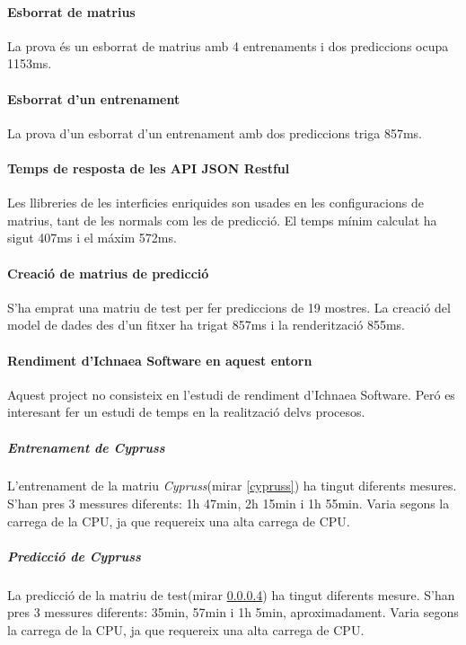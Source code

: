 \paragraph{Esborrat de matrius}
La prova \'{e}s un esborrat de matrius amb 4 entrenaments i dos prediccions ocupa 1153ms.
\paragraph{Esborrat d'un entrenament}
La prova d'un esborrat d'un entrenament amb dos prediccions triga 857ms.
\paragraph{Temps de resposta de les API JSON Restful}
Les llibreries de les interficies enriquides son usades en les configuracions de matrius, tant de les normals com les de predicci\'{o}. El temps m\'{i}nim calculat ha sigut 407ms i el m\'{a}xim 572ms.
\paragraph{Creaci\'{o} de matrius de predicci\'{o}}
\label{cypruss_test}
S'ha emprat una matriu de test per fer prediccions de 19 mostres. La creaci\'{o} del model de dades des d'un fitxer ha trigat 857ms i la renderitzaci\'{o} 855ms.
\paragraph{Rendiment d'Ichnaea Software en aquest entorn}
Aquest project no consisteix en l'estudi de rendiment d'Ichnaea Software. Per\'{o} es interesant fer un estudi de temps en la realitzaci\'{o} delvs procesos.
\subparagraph{Entrenament de \textit{Cypruss}}
L'entrenament de la matriu \textit{Cypruss}(mirar \ref{cypruss}) ha tingut diferents mesures. S'han pres 3 messures diferents: 1h 47min, 2h 15min i 1h 55min. Varia segons la carrega de la CPU, ja que requereix una alta carrega de CPU.
\subparagraph{Predicci\'{o} de \textit{Cypruss}}
La predicci\'{o} de la matriu de test(mirar \ref{cypruss_test}) ha tingut diferents mesure. S'han pres 3 messures diferents:
35min, 57min i 1h 5min, aproximadament. Varia segons la carrega de la CPU, ja que requereix una alta carrega de CPU.

